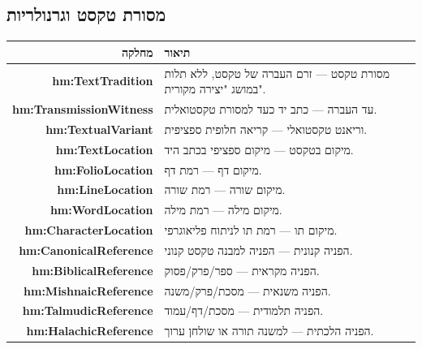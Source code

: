 \documentclass[12pt,a4paper]{article}
\newcommand{\new}[1]{\textcolor{newaddition}{#1}}
\newcommand{\newclass}[1]{\textcolor{newaddition}{\textbf{#1}}}
\begin{document}
\subsection{\new{ מסורת טקסט וגרנולריות}}

\begin{longtable}{|r|p{10cm}|}
\hline
\textbf{מחלקה} & \textbf{תיאור} \\
\hline
\endhead

\newclass{hm:TextTradition} & 
\new{מסורת טקסט — זרם העברה של טקסט, ללא תלות במושג "יצירה מקורית".}\\
\hline

\newclass{hm:TransmissionWitness} & 
\new{עד העברה — כתב יד כעד למסורת טקסטואלית.}\\
\hline

\newclass{hm:TextualVariant} & 
\new{וריאנט טקסטואלי — קריאה חלופית ספציפית.}\\
\hline

\newclass{hm:TextLocation} & 
\new{מיקום בטקסט — מיקום ספציפי בכתב היד.}\\
\hline

\newclass{hm:FolioLocation} & 
\new{מיקום דף — רמת דף.}\\
\hline

\newclass{hm:LineLocation} & 
\new{מיקום שורה — רמת שורה.}\\
\hline

\newclass{hm:WordLocation} & 
\new{מיקום מילה — רמת מילה.}\\
\hline

\newclass{hm:CharacterLocation} & 
\new{מיקום תו — רמת תו לניתוח פליאוגרפי.}\\
\hline

\newclass{hm:CanonicalReference} & 
\new{הפניה קנונית — הפניה למבנה טקסט קנוני.}\\
\hline

\newclass{hm:BiblicalReference} & 
\new{הפניה מקראית — ספר/פרק/פסוק.}\\
\hline

\newclass{hm:MishnaicReference} & 
\new{הפניה משנאית — מסכת/פרק/משנה.}\\
\hline

\newclass{hm:TalmudicReference} & 
\new{הפניה תלמודית — מסכת/דף/עמוד.}\\
\hline

\newclass{hm:HalachicReference} & 
\new{הפניה הלכתית — למשנה תורה או שולחן ערוך.}\\
\hline


\end{longtable}
\end{document}
